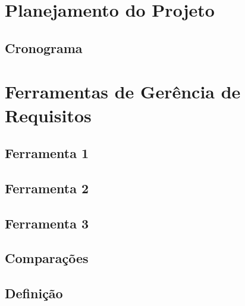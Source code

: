 \chapter[Planejamento do Projeto]{Planejamento do Projeto}
\section{Cronograma}

\chapter[Ferramentas de Gerência de Requisitos]{Ferramentas de Gerência de Requisitos}
\section{Ferramenta 1}
\section{Ferramenta 2}
\section{Ferramenta 3}
\section{Comparações}
\section{Definição}

